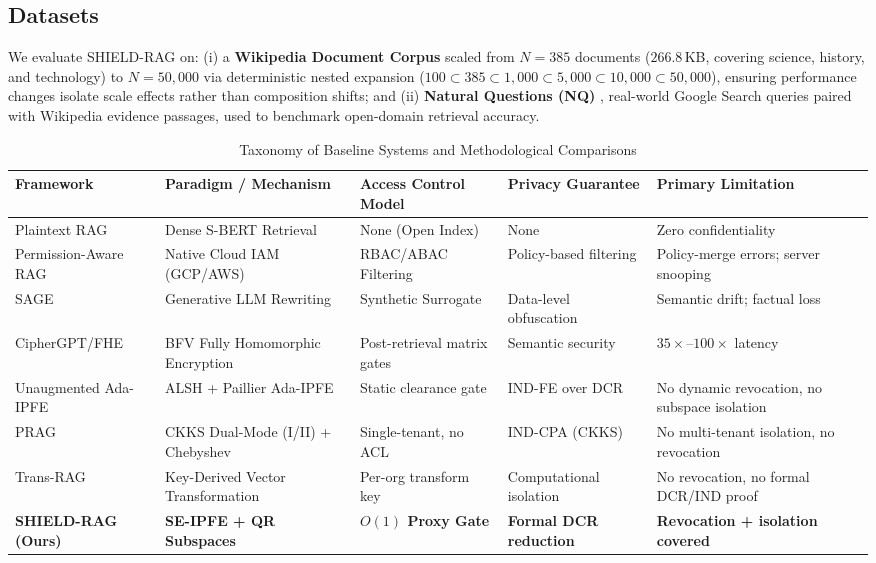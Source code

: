 \documentclass[10pt,a4paper]{article}
\begin{document}
\subsection{Datasets}
We evaluate SHIELD-RAG on: (i) a \textbf{Wikipedia Document Corpus} scaled from $N=385$ documents ($266.8$\,KB, covering science, history, and technology) to $N=50{,}000$ via deterministic nested expansion ($100 \subset 385 \subset 1{,}000 \subset 5{,}000 \subset 10{,}000 \subset 50{,}000$), ensuring performance changes isolate scale effects rather than composition shifts; and (ii) \textbf{Natural Questions (NQ)} \cite{kwiatkowski2019natural}, real-world Google Search queries paired with Wikipedia evidence passages, used to benchmark open-domain retrieval accuracy.

\begin{table}[t]
\centering
\caption{Taxonomy of Baseline Systems and Methodological Comparisons}
\label{tab:baselines}
\renewcommand{\arraystretch}{1.15}
\small
\begin{tabular}{@{}p{2.6cm}p{2.9cm}p{2.6cm}p{2.5cm}p{3.0cm}@{}}
\toprule
\textbf{Framework} & \textbf{Paradigm / Mechanism} & \textbf{Access Control Model} & \textbf{Privacy Guarantee} & \textbf{Primary Limitation} \\ \midrule
Plaintext RAG \cite{lewis2020rag} & Dense S-BERT Retrieval & None (Open Index) & None & Zero confidentiality \\
Permission-Aware RAG \cite{jeong2025permissionaware} & Native Cloud IAM (GCP/AWS) & RBAC/ABAC Filtering & Policy-based filtering & Policy-merge errors; server snooping \\
SAGE \cite{zeng2025mitigating} & Generative LLM Rewriting & Synthetic Surrogate & Data-level obfuscation & Semantic drift; factual loss \\
CipherGPT/FHE \cite{hou2026ciphergpt} & BFV Fully Homomorphic Encryption & Post-retrieval matrix gates & Semantic security & $35\times$--$100\times$ latency \\
Unaugmented Ada-IPFE \cite{zhou2026cipherag, yang2022privacypreserving} & ALSH + Paillier Ada-IPFE & Static clearance gate & IND-FE over DCR & No dynamic revocation, no subspace isolation \\
PRAG \cite{li2026prag} & CKKS Dual-Mode (I/II) + Chebyshev & Single-tenant, no ACL & IND-CPA (CKKS) & No multi-tenant isolation, no revocation \\
Trans-RAG \cite{liu2026transrag} & Key-Derived Vector Transformation & Per-org transform key & Computational isolation & No revocation, no formal DCR/IND proof \\
\textbf{SHIELD-RAG (Ours)} & \textbf{SE-IPFE + QR Subspaces} & \textbf{$O(1)$ Proxy Gate} & \textbf{Formal DCR reduction} & \textbf{Revocation + isolation covered} \\ \bottomrule
\end{tabular}
\end{table}
\end{document}
